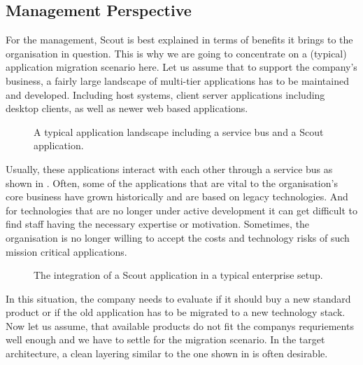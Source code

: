 \documentclass[a4paper,10pt,twoside]{book}
\begin{document}
\subsection{Management Perspective}

For the management, Scout is best explained in terms of benefits it brings to the organisation in question. 
This is why we are going to concentrate on a (typical) application migration scenario here. 
Let us assume that to support the company's business, a fairly large landscape of multi-tier applications has to be maintained and developed. 
Including host systems, client server applications including desktop clients, as well as newer web based applications. 

\begin{figure}
\caption{A typical application landscape including a service bus and a Scout application.}
\end{figure}

Usually, these applications interact with each other through a service bus as shown in . 
Often, some of the applications that are vital to the organisation's core business have grown historically and are based on legacy technologies. 
And for technologies that are no longer under active development it can get difficult to find staff having the necessary expertise or motivation. 
Sometimes, the organisation is no longer willing to accept the costs and technology risks of such mission critical applications. 

\begin{figure}
\caption{The integration of a Scout application in a typical enterprise setup.}
\end{figure}

In this situation, the company needs to evaluate if it should buy a new standard product or if the old application has to be migrated to a new technology stack. 
Now let us assume, that available products do not fit the companys requriements well enough and we have to settle for the migration scenario.
In the target architecture, a clean layering similar to the one shown in  is often desirable.
\end{document}

